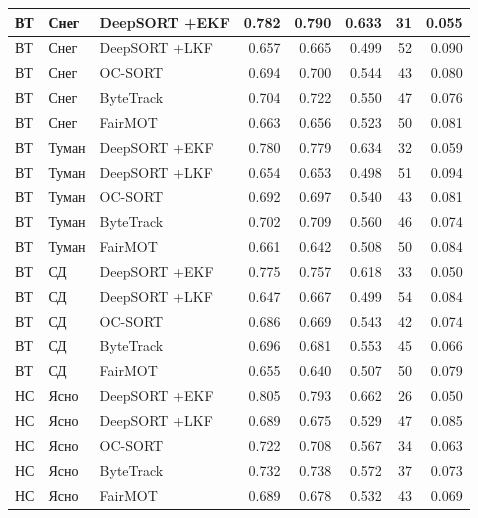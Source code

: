 \begin{longtable}{|p{2.42cm}|p{1.8cm}|p{2.4cm}|r|r|r|r|r|}
       ВТ     &      Снег & DeepSORT +EKF & 0.782 & 0.790 & 0.633 &   31 & 0.055  \\ \hline
       ВТ     &      Снег & DeepSORT +LKF & 0.657 & 0.665 & 0.499 &   52 & 0.090  \\ \hline
       ВТ     &      Снег &      OC-SORT & 0.694 & 0.700 & 0.544 &   43 & 0.080  \\ \hline
       ВТ     &      Снег &    ByteTrack & 0.704 & 0.722 & 0.550 &   47 & 0.076  \\ \hline
       ВТ     &      Снег &      FairMOT & 0.663 & 0.656 & 0.523 &   50 & 0.081  \\ \hline
       ВТ     &      Туман & DeepSORT +EKF & 0.780 & 0.779 & 0.634 &   32 & 0.059  \\ \hline
       ВТ     &      Туман & DeepSORT +LKF & 0.654 & 0.653 & 0.498 &   51 & 0.094  \\ \hline
       ВТ     &      Туман &      OC-SORT & 0.692 & 0.697 & 0.540 &   43 & 0.081  \\ \hline
       ВТ     &      Туман &    ByteTrack & 0.702 & 0.709 & 0.560 &   46 & 0.074  \\ \hline
       ВТ     &      Туман &      FairMOT & 0.661 & 0.642 & 0.508 &   50 & 0.084  \\ \hline
       ВТ     &      СД & DeepSORT +EKF & 0.775 & 0.757 & 0.618 &   33 & 0.050  \\ \hline
       ВТ     &      СД & DeepSORT +LKF & 0.647 & 0.667 & 0.499 &   54 & 0.084  \\ \hline
       ВТ     &      СД &      OC-SORT & 0.686 & 0.669 & 0.543 &   42 & 0.074  \\ \hline
       ВТ     &      СД &    ByteTrack & 0.696 & 0.681 & 0.553 &   45 & 0.066  \\ \hline
       ВТ     &      СД &      FairMOT & 0.655 & 0.640 & 0.507 &   50 & 0.079  \\ \hline
       НС     &      Ясно & DeepSORT +EKF & 0.805 & 0.793 & 0.662 &   26 & 0.050  \\ \hline
       НС     &      Ясно & DeepSORT +LKF & 0.689 & 0.675 & 0.529 &   47 & 0.085  \\ \hline
       НС     &      Ясно &      OC-SORT & 0.722 & 0.708 & 0.567 &   34 & 0.063  \\ \hline
       НС     &      Ясно &    ByteTrack & 0.732 & 0.738 & 0.572 &   37 & 0.073  \\ \hline
       НС     &      Ясно &      FairMOT & 0.689 & 0.678 & 0.532 &   43 & 0.069  \\ \hline

\end{longtable}

